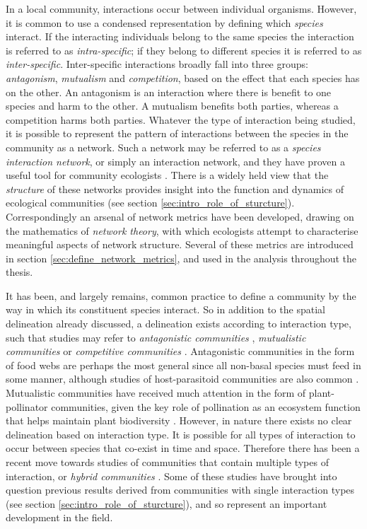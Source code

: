 In a local community, interactions occur between individual organisms. However, it is common to use a condensed representation by defining which \emph{species} interact. If the interacting individuals belong to the same species the interaction is referred to as \emph{intra-specific}; if they belong to different species it is referred to as \emph{inter-specific}. Inter-specific interactions broadly fall into three groups: \emph{antagonism}, \emph{mutualism} and \emph{competition}, based on the effect that each species has on the other. An antagonism is an interaction where there is benefit to one species and harm to the other. A mutualism benefits both parties, whereas a competition harms both parties. Whatever the type of interaction being studied, it is possible to represent the pattern of interactions between the species in the community as a network. Such a network may be referred to as a \emph{species interaction network}, or simply an interaction network, and they have proven a useful tool for community ecologists \cite{bascompte2007networks}. There is a widely held view that the \emph{structure} of these networks provides insight into the function and dynamics of ecological communities (see section \ref{sec:intro_role_of_sturcture}). Correspondingly an arsenal of network metrics have been developed, drawing on the mathematics of \emph{network theory}, with which ecologists attempt to characterise meaningful aspects of network structure. Several of these metrics are introduced in section \ref{sec:define_network_metrics}, and used in the analysis throughout the thesis.

It has been, and largely remains, common practice to define a community by the way in which its constituent species interact. So in addition to the spatial delineation already discussed, a delineation exists according to interaction type, such that studies may refer to \emph{antagonistic communities} \cite{albrecht2007interaction}, \emph{mutualistic communities} \cite{bascompte2007plant} or \emph{competitive communities} \cite{klausmeier2001habitat}. Antagonistic communities in the form of food webs are perhaps the most general since all non-basal species must feed in some manner, although studies of host-parasitoid communities are also common \cite{laliberte2010deforestation}. Mutualistic communities have received much attention in the form of plant-pollinator communities, given the key role of pollination as an ecosystem function that helps maintain plant biodiversity \cite{vanbergen2013threats}. However, in nature there exists no clear delineation based on interaction type. It is possible for all types of interaction to occur between species that co-exist in time and space. Therefore there has been a recent move towards studies of communities that contain multiple types of interaction, or \emph{hybrid communities} \cite{sauve2014structure,kefi2012more,fontaine2011ecological,evans2013robustness,montoya2015functional,mougi2012diversity}. Some of these studies have brought into question previous results derived from communities with single interaction types (see section \ref{sec:intro_role_of_sturcture}), and so represent an important development in the field.

